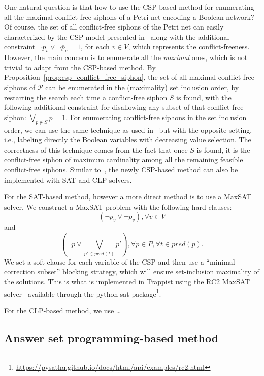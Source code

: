 \documentclass[preprint,12pt]{elsarticle}
\begin{document}
One natural question is that how to use the CSP-based method for enumerating all the maximal conflict-free siphons of a Petri net encoding a Boolean network?
Of course, the set of all conflict-free siphons of the Petri net can easily characterized by the CSP model presented in~\cite{nabli2016enumerating} along with the additional constraint \(\neg p_v \vee \neg \overline{p}_v = 1\), for each \(v \in V\), which represents the conflict-freeness.
However, the main concern is to enumerate all the \emph{maximal} ones, which is not trivial to adapt from the CSP-based method.
By Proposition~\ref{prop:csp_conflict_free_siphon}, the set of all maximal conflict-free siphons of \(\mathcal{P}\) can be enumerated in the (maximality) set inclusion order, by restarting the search each time a conflict-free siphon \(S\) is found, with the following additional constraint for disallowing any subset of that conflict-free siphon: \(\bigvee_{p \not \in S} p = 1\).
For enumerating conflict-free siphons in the set inclusion order, we can use the same technique as used in~\cite{nabli2016enumerating} but with the opposite setting, i.e., labeling directly the Boolean variables with decreasing value selection.
The correctness of this technique comes from the fact that once \(S\) is found, it is the conflict-free siphon of maximum cardinality among all the remaining feasible conflict-free siphons.
Similar to~\cite{nabli2016enumerating}, the newly CSP-based method can also be implemented with SAT and CLP solvers.

For the SAT-based method, however a more direct method is to use a MaxSAT solver.
We construct a MaxSAT problem with the following hard clauses:
\[
  (\neg p_v \vee \neg \overline{p}_v), \forall v \in V
\]
and
\[
  (\neg p \vee \bigvee_{p' \in pred(t)}p'), \forall p \in P, \forall t \in pred(p).
\]
We set a soft clause for each variable of the CSP and then use a ``minimal correction subset'' blocking strategy, which will ensure set-inclusion maximality of the solutions.
This is what is implemented in Trappist using the RC2 MaxSAT solver~\cite{DBLP:journals/jsat/IgnatievMM19} available through the python-sat package\footnote{\url{https://pysathq.github.io/docs/html/api/examples/rc2.html}}.

For the CLP-based method, we use \dots

\subsection{Answer set programming-based method}
\label{subsec:computation_asp}
\end{document}
